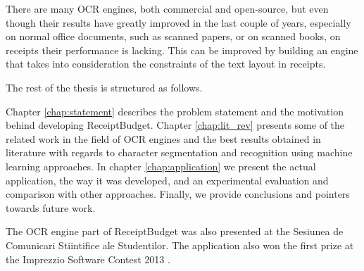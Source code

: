 There are many OCR engines, both commercial and open-source, but even though their results have greatly improved in the last couple of years, especially on normal office documents, such as scanned papers, or on scanned books, on receipts their performance is lacking. This can be improved by building an engine that takes into consideration the constraints of the text layout in receipts. 

The rest of the thesis is structured as follows.

Chapter \ref{chap:statement} describes the problem statement and the motivation behind developing ReceiptBudget. Chapter \ref{chap:lit_rev} presents some of the related work in the field of OCR engines and the best results obtained in literature with regards to character segmentation and  recognition using machine learning approaches. In chapter \ref{chap:application} we present the actual application, the way it was developed, and an experimental evaluation and comparison with other approaches. Finally, we provide conclusions and pointers towards future work. 

The OCR engine part of ReceiptBudget was also presented at the Sesiunea de Comunicari Stiintifice ale Studentilor. The application also won the first prize at the Imprezzio Software Contest 2013 \cite{imprezzio}. 